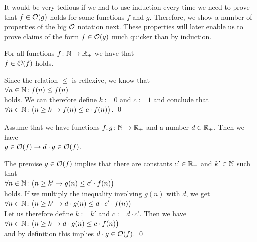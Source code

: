 It would be very tedious if we had to use induction every time we need to prove that 
$f \in \mathcal{O}(g)$ holds for some functions $f$ and $g$.   Therefore, we show a number of properties of the
big $\mathcal{O}$ notation next.  These properties will later enable us to prove claims of the form 
$f \in \mathcal{O}(g)$ much quicker than by induction.

\begin{Proposition} 
  For all functions $f\colon {\mathbb N} \rightarrow {{\mathbb R}_+}$ we have that
  \\[0.2cm]
  \hspace*{1.3cm} $f \in \mathcal{O}(f)$ \quad holds. 
\end{Proposition}

\proof
Since the relation $\leq$ is reflexive, we know that 
\\[0.2cm]
\hspace*{1.3cm}
$\forall n \in {\mathbb N}\colon f(n) \leq f(n)$
\\[0.2cm]
holds.  We can therefore define $k:=0$ and $c:=1$ and conclude that
\\[0.2cm]
\hspace*{1.3cm}
$\forall n \in {\mathbb N}\colon\bigl(n \geq k \rightarrow f(n) \leq c \cdot f(n)\bigr)$. \qed

\begin{Proposition} \hspace*{\fill} \linebreak
Assume that we have functions  $f,g\colon {\mathbb N} \rightarrow {{\mathbb R}_+}$ and a number $d \in {\mathbb R}_+$.  Then we
have 
\\[0.2cm]
\hspace*{1.3cm}
 $g \in \mathcal{O}(f) \rightarrow d \cdot g \in \mathcal{O}(f)$.
\end{Proposition}

\proof
The premise $g \in \mathcal{O}(f)$ implies that there are constants $c'\in {\mathbb R}_+$ and $k'\in {\mathbb N}$ 
such that \\[0.2cm]
\hspace*{1.3cm} 
$\forall n \in {\mathbb N} \colon \bigl(n \geq k'  \rightarrow g(n) \leq c' \cdot f(n)\bigr)$ 
\\[0.2cm]
holds.  If we multiply the inequality involving $g(n)$ with $d$, we get \\[0.2cm]
\hspace*{1.3cm} 
$\forall n \in {\mathbb N} \colon\bigl( n \geq k'  \rightarrow d \cdot g(n) \leq d \cdot c' \cdot f(n)\bigr)$ 
\\[0.2cm]
Let us therefore define $k:=k'$ and $c := d \cdot c'$.  Then we have \\[0.2cm]
\hspace*{1.3cm}
$\forall n \in {\mathbb N} \colon \bigl(n \geq k  \rightarrow d \cdot g(n) \leq c \cdot f(n)\bigr)$ 
\\[0.2cm]
and by definition this implies $d \cdot g \in \mathcal{O}(f)$. \qed
\vspace*{0.2cm}


